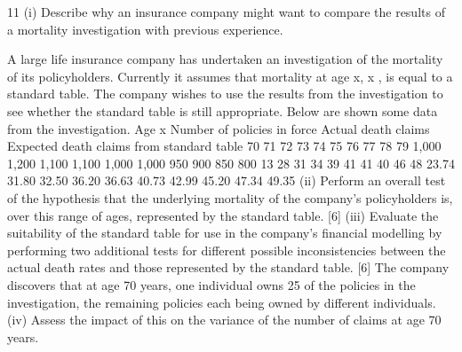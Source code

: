 \documentclass[a4paper,12pt]{article}
\begin{document}
11
(i)
Describe why an insurance company might want to compare the results of a
mortality investigation with previous experience.

A large life insurance company has undertaken an investigation of the mortality of its
policyholders. Currently it assumes that mortality at age x, \mu x , is equal to a standard
table. The company wishes to use the results from the investigation to see whether
the standard table is still appropriate. Below are shown some data from the
investigation.
Age x Number of
policies in force Actual death
claims Expected death
claims from
standard table
70
71
72
73
74
75
76
77
78
79 1,000
1,200
1,100
1,100
1,000
1,000
950
900
850
800 13
28
31
34
39
41
41
40
46
48 23.74
31.80
32.50
36.20
36.63
40.73
42.99
45.20
47.34
49.35
(ii) Perform an overall test of the hypothesis that the underlying mortality of the
company’s policyholders is, over this range of ages, represented by the
standard table.
[6]
(iii) Evaluate the suitability of the standard table for use in the company’s financial
modelling by performing two additional tests for different possible
inconsistencies between the actual death rates and those represented by the
standard table.
[6]
The company discovers that at age 70 years, one individual owns 25 of the policies in
the investigation, the remaining policies each being owned by different individuals.
(iv)
Assess the impact of this on the variance of the number of claims at age 70
years.
\end{document}
